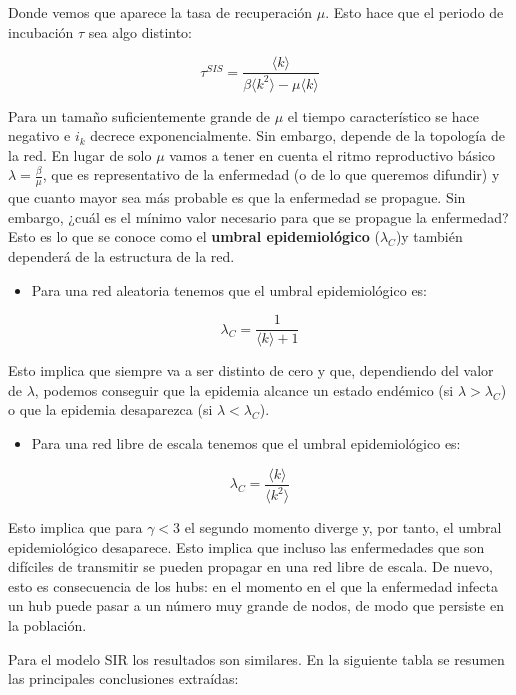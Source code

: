 \documentclass[]{article}
\begin{document}
Donde vemos que aparece la tasa de recuperación \(\mu\). Esto hace que
el periodo de incubación \(\tau\) sea algo distinto:

\[\tau^{SIS} = \frac{\langle k \rangle}{\beta \langle k^2 \rangle - \mu \langle k \rangle}\]

Para un tamaño suficientemente grande de \(\mu\) el tiempo
característico se hace negativo e \(i_k\) decrece exponencialmente. Sin
embargo, depende de la topología de la red. En lugar de solo \(\mu\)
vamos a tener en cuenta el ritmo reproductivo básico
\(\lambda = \frac{\beta}{\mu}\), que es representativo de la enfermedad
(o de lo que queremos difundir) y que cuanto mayor sea más probable es
que la enfermedad se propague. Sin embargo, ¿cuál es el mínimo valor
necesario para que se propague la enfermedad? Esto es lo que se conoce
como el \textbf{umbral epidemiológico} (\(\lambda_C\))y también
dependerá de la estructura de la red.

\begin{itemize}
\itemsep1pt\parskip0pt
\item
  Para una red aleatoria tenemos que el umbral epidemiológico es:
\end{itemize}

\[\lambda_C = \frac{1}{\langle k \rangle +1}\]

Esto implica que siempre va a ser distinto de cero y que, dependiendo
del valor de \(\lambda\), podemos conseguir que la epidemia alcance un
estado endémico (si \(\lambda > \lambda_C\)) o que la epidemia
desaparezca (si \(\lambda < \lambda_C\)).

\begin{itemize}
\itemsep1pt\parskip0pt
\item
  Para una red libre de escala tenemos que el umbral epidemiológico es:
\end{itemize}

\[\lambda_C = \frac{\langle k \rangle}{\langle k^2 \rangle}\]

Esto implica que para \(\gamma < 3\) el segundo momento diverge y, por
tanto, el umbral epidemiológico desaparece. Esto implica que incluso las
enfermedades que son difíciles de transmitir se pueden propagar en una
red libre de escala. De nuevo, esto es consecuencia de los hubs: en el
momento en el que la enfermedad infecta un hub puede pasar a un número
muy grande de nodos, de modo que persiste en la población.

Para el modelo SIR los resultados son similares. En la siguiente tabla
se resumen las principales conclusiones extraídas:
\end{document}
